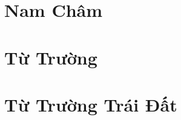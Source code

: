 \documentclass{article}
\begin{document}
\section{Nam Châm}


\section{Từ Trường}


\section{Từ Trường Trái Đất}


\printbibliography[heading=bibintoc]
	
\end{document}

